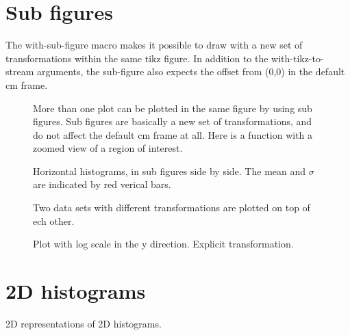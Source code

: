 \documentclass{article}
\begin{document}
\section{Sub figures}


The with-sub-figure macro makes it possible to draw with a new set of transformations
within the same tikz figure. In addition to the with-tikz-to-stream arguments, the sub-figure also
expects the offset from (0,0) in the default cm frame.

\begin{figure}[H]
\centering

\captionsetup{singlelinecheck=off}
\caption[asdf]{More than one plot can be plotted in the same figure by using sub figures.
Sub figures are basically a new set of transformations, and do not affect the default cm frame at all.
Here is a function with a zoomed view of a region of interest.}
\end{figure}
\begin{figure}[H]
\centering

\captionsetup{singlelinecheck=off}
\caption[asdf]{Horizontal histograms, in sub figures side by side. The mean and $\sigma$ are indicated by red verical bars.}
\end{figure}
\begin{figure}[H]
\centering

\captionsetup{singlelinecheck=off}
\caption[asdf]{Two data sets with different transformations are plotted on top of ech other.}
\end{figure}
\begin{figure}[H]
\centering

\captionsetup{singlelinecheck=off}
\caption[asdf]{Plot with log scale in the y direction. Explicit transformation.}
\end{figure}
\section{2D histograms}


2D representations of 2D histograms.
\end{document}
